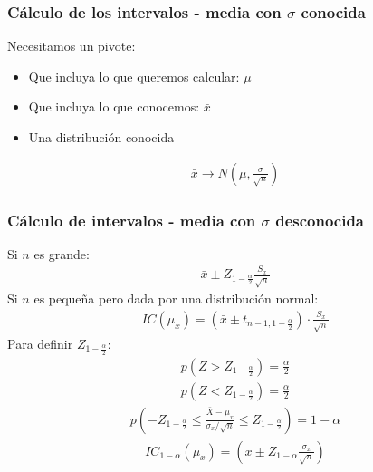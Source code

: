 \documentclass{article}
\begin{document}
\subsubsection{Cálculo de los intervalos - media con $\sigma $ conocida}
Necesitamos un pivote:
\begin{itemize}
    \item Que incluya lo que queremos calcular: $\mu $
    \item Que incluya lo que conocemos: $\bar{x}$
    \item Una distribución conocida
\end{itemize}
\begin{equation}
    \begin{split}
        \bar{x}\to N(\mu , \frac{\sigma }{\sqrt{n}})
    \end{split}
\end{equation}
\subsubsection{Cálculo de intervalos - media con $\sigma $ desconocida}
Si $n$ es grande:
\begin{equation}
    \begin{split}
        \bar{x} \pm Z_{1-\frac{\alpha }{2}} \frac{S_{x}}{\sqrt{n}}
    \end{split}
\end{equation}
Si $n$ es pequeña pero dada por una distribución normal:
\begin{equation}
    \begin{split}
        IC(\mu _{x}) = (\bar{x}\pm t_{n-1,1-\frac{\alpha }{2}})\cdot \frac{S_{x}}{\sqrt{n}}
    \end{split}
\end{equation}
Para definir $Z_{1-\frac{\alpha }{2}}$:
\begin{equation}
    \begin{split}
        p(Z> Z_{1-\frac{\alpha }{2}}) = \frac{\alpha}{2}
    \end{split}
\end{equation}
\begin{equation}
    \begin{split}
        p(Z < Z_{1-\frac{\alpha}{2}})= \frac{\alpha}{2}
    \end{split}
\end{equation}
\begin{equation}
    \begin{split}
        p(-Z_{1-\frac{\alpha}{2}} \leq \frac{\bar{X}-\mu _{x}}{\sigma _{x} / \sqrt{n}}\leq Z_{1-\frac{\alpha}{2}})= 1-\alpha 
    \end{split}
\end{equation}
\begin{equation}
    \begin{split}
        IC_{1-\alpha }(\mu _{x})= (\bar{x}\pm Z_{1-\alpha } \frac{\sigma _{x}}{\sqrt{n}})
    \end{split}
\end{equation}
\end{document}
